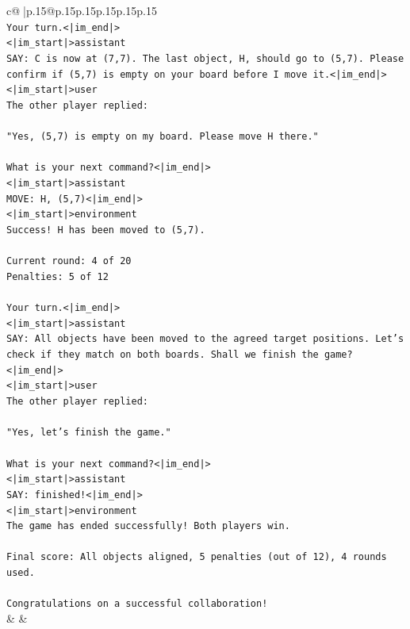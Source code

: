 \documentclass{article}
\begin{document}
{\begin{supertabular}{c@{$\;$}|p{.15\linewidth}@{}p{.15\linewidth}p{.15\linewidth}p{.15\linewidth}p{.15\linewidth}p{.15\linewidth}}
{{{\\ 
\texttt{Your turn.<|im\_end|>} \\
\texttt{<|im\_start|>assistant} \\
\texttt{SAY: C is now at (7,7). The last object, H, should go to (5,7). Please confirm if (5,7) is empty on your board before I move it.<|im\_end|>} \\
\texttt{<|im\_start|>user} \\
\texttt{The other player replied:} \\
\\ 
\texttt{"Yes, (5,7) is empty on my board. Please move H there."} \\
\\ 
\texttt{What is your next command?<|im\_end|>} \\
\texttt{<|im\_start|>assistant} \\
\texttt{MOVE: H, (5,7)<|im\_end|>} \\
\texttt{<|im\_start|>environment} \\
\texttt{Success! H has been moved to (5,7).} \\
\\ 
\texttt{Current round: 4 of 20} \\
\texttt{Penalties: 5 of 12} \\
\\ 
\texttt{Your turn.<|im\_end|>} \\
\texttt{<|im\_start|>assistant} \\
\texttt{SAY: All objects have been moved to the agreed target positions. Let's check if they match on both boards. Shall we finish the game?<|im\_end|>} \\
\texttt{<|im\_start|>user} \\
\texttt{The other player replied:} \\
\\ 
\texttt{"Yes, let's finish the game."} \\
\\ 
\texttt{What is your next command?<|im\_end|>} \\
\texttt{<|im\_start|>assistant} \\
\texttt{SAY: finished!<|im\_end|>} \\
\texttt{<|im\_start|>environment} \\
\texttt{The game has ended successfully! Both players win.} \\
\\ 
\texttt{Final score: All objects aligned, 5 penalties (out of 12), 4 rounds used.} \\
\\ 
\texttt{Congratulations on a successful collaboration!} \\
            }
        }
    }
    & & \\ \\


\end{supertabular}}
\end{document}
